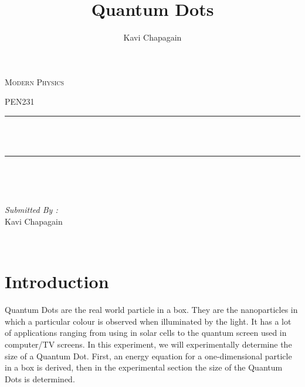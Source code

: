 \documentclass[12pt]{report}
\title{Quantum Dots}
\author{ Kavi Chapagain}
\makeatletter
\let\thetitle\@title
\makeatother
\begin{document}

\begin{titlepage}
	\centering
    \vspace*{0.5 cm}
    
\begin{center}    \textsc{\Large   Modern Physics}\\[2.0 cm]	\end{center}
	\textsc{\Large PEN231  }\\[0.5 cm]				%
	\rule{\linewidth}{0.2 mm} \\[0.4 cm]
	{ \huge \bfseries \thetitle}\\
	\rule{\linewidth}{0.2 mm} \\[1.5 cm]
	
	\begin{minipage}{0.4\textwidth}
		\begin{flushleft} \large
			\end{flushleft}
			\end{minipage}~
			\begin{minipage}{0.4\textwidth}
			\begin{flushright} \large
			\emph{Submitted By :} \\Kavi Chapagain 
		\end{flushright}
	\end{minipage}\\[2 cm]
	
    
    
	
\end{titlepage}


\tableofcontents
\pagebreak


\renewcommand{\thesection}{\arabic{section}}
\section{Introduction}

Quantum Dots are the real world particle in a box. They are the nanoparticles in which a particular colour is observed when illuminated by the light. It has a lot of applications ranging from using in solar cells to the quantum screen used in computer/TV screens.
\newline In this experiment, we will experimentally determine the size of a Quantum Dot. First, an energy equation for a one-dimensional particle in a box is derived, then in the experimental section the size of the Quantum Dots is determined.
\end{document}
